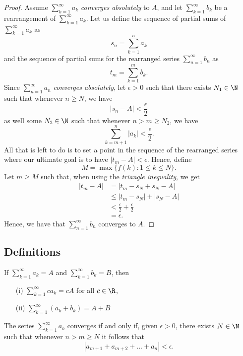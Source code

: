 \begin{proof}
Assume \(\sum_{k=1}^{\infty} a_k \) \textit{converges absolutely} to \(A\), and let \( \sum_{k=1}^{\infty} b_k \) be a rearrangement of \( \sum_{k=1}^{\infty} a_k\). 
Let us define the sequence of partial sums of \( \sum_{k=1}^{\infty} a_k\) as 
\[ s_n = \sum_{k=1}^{n}a_k\] and the sequence of partial sums for the rearranged series \( \sum_{n=1}^{\infty}b_n\) as 
\[ t_m = \sum_{k=1}^{m} b_k.\] Since \( \sum_{n=1}^{\infty}a_n\) \textit{converges absolutely}, let \(\epsilon > 0 \) such that there exists \( N_1 \in \N \) such that whenever \( n \geq N \), we have 
\[ |s_n - A | < \frac{\epsilon}{2}\]
as well some \( N_2 \in \N \) such that whenever \( n > m \geq N_2\), we have 
\[ \sum_{k=m+1}^{n} |a_k| < \frac{\epsilon}{2}.\]
All that is left to do is to set a point in the sequence of the rearranged series where our ultimate goal is to have \( |t_m - A | < \epsilon.\) Hence, define 
\[ M = \max \{ f(k): 1 \leq k \leq N \}.\]
Let \( m \geq M \) such that, when using the \textit{triangle inequality}, we get 
\begin{align*}
    |t_m - A | &= |t_m - s_N + s_N - A |  \\
               &\leq |t_m - s_N | + |s_N - A | \\
               &< \frac{\epsilon}{2} + \frac{\epsilon}{2} \\
               &= \epsilon.
\end{align*}
Hence, we have that \( \sum_{n=1}^{\infty}b_n \) converges to \(A\).
\end{proof}

\subsection{Definitions}


\begin{tcolorbox}
    \begin{thm} 
If \( \sum_{k=1}^{ \infty} a_k = A \) and \( \sum_{k=1}^{ \infty} b_k = B \), then 
\begin{enumerate}
    \item[(i)] \( \sum_{k=1}^{ \infty } ca_k = cA \) for all \( c \in \R \),
    \item[(ii)] \( \sum_{k=1}^{ \infty } (a_k + b_k) = A + B\)
\end{enumerate}
\end{thm}
\end{tcolorbox}


\begin{tcolorbox}
    \begin{thm}
     The series \( \sum_{k=1}^{ \infty} a_k \) converges if and only if, given \( \epsilon > 0\), there exists \( N \in \N \) such that whenever \( n > m \geq N \) it follows that 
     \[ |a_{m+1} + a_{m+2} + ... + a_n| < \epsilon.\]
    \end{thm}
\end{tcolorbox}


